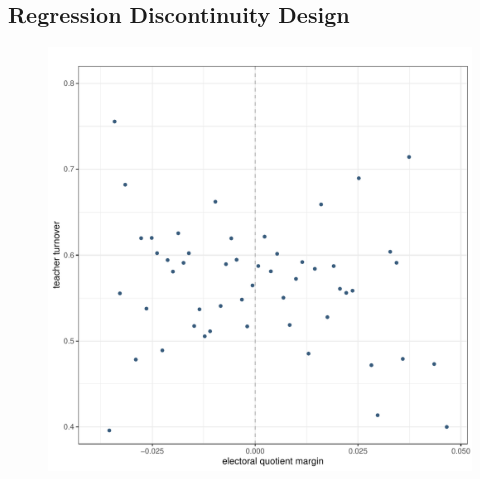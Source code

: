 \documentclass[12pt,a4paper]{article}
\newcommand{\blue}{\textcolor{blue}}
\begin{document}
\pagebreak

\subsection{Regression Discontinuity Design}

\begin{figure}[h]
    \centering
    \includegraphics[width=0.7\linewidth]{plots/visual_rdd_legislative_seat_flip.pdf}
\end{figure}




\end{document}
